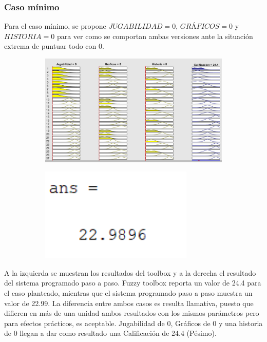 \documentclass[11pt, letterpaper]{article}
\begin{document}
\subsubsection{Caso mínimo}

Para el caso mínimo, se propone  $JUGABILIDAD = 0$, $GRÁFICOS = 0$ y $HISTORIA = 0$ para ver como se comportan ambas versiones ante la situación extrema de puntuar todo con 0.

\begin{figure}[h]
	\centering
	\begin{subfigure}{0.40\textwidth} %
		\centering
		\includegraphics[width=1.4\textwidth]{IMG/RP11.png}
		\label{fig:G3}
	\end{subfigure}
	\hfill
	\begin{subfigure}{0.42\textwidth} %
		\centering
		\includegraphics[width=0.8\textwidth]{IMG/M11.png}
		\label{fig:G4}
	\end{subfigure}
	\label{fig:comparacion2}
\end{figure}

A la izquierda se muestran los resultados del toolbox y a la derecha el resultado del sistema programado paso a paso. 
Fuzzy toolbox reporta un valor de 24.4 para el caso planteado, mientras que el sistema programado paso a paso muestra un valor de 22.99. La diferencia entre ambos casos es resulta llamativa, puesto que difieren en más de una unidad ambos resultados con los mismos parámetros pero para efectos prácticos, es aceptable. Jugabilidad de 0, Gráficos de 0 y una historia de 0 llegan a dar como resultado una Calificación de 24.4 (Pésimo).
\end{document}
